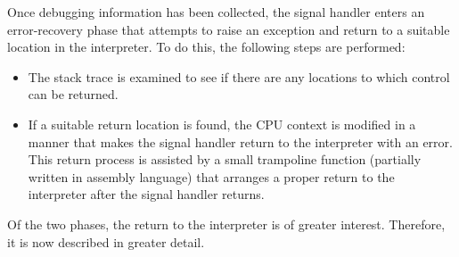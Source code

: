 Once debugging information has been collected, the signal handler
enters an error-recovery phase that
attempts to raise an exception and return to a suitable location in the 
interpreter.  To do this, the following steps are performed:

\begin{itemize}

\item The stack trace is examined to see if there are any locations to which
control can be returned. 

\item If a suitable return location is found, the CPU context is modified in
a manner that makes the signal handler return to the interpreter
with an error.  This return process is assisted by a small
trampoline function (partially written in assembly language) that arranges a proper
return to the interpreter after the signal handler returns.
\end{itemize}

\noindent
Of the two phases, the return to the interpreter is of greater interest. Therefore, it
is now described in greater detail.

